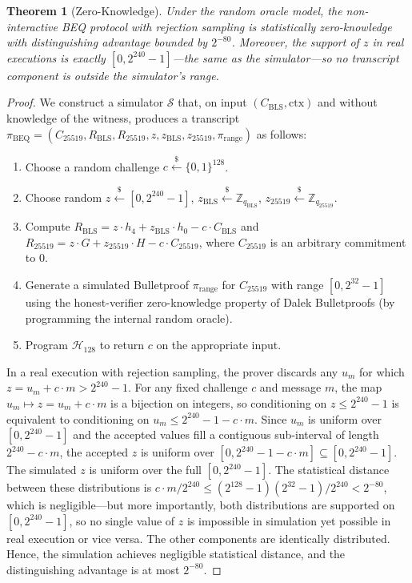 \documentclass[11pt]{article}
\theoremstyle{definitionstyle}
\newtheorem{theorem}{Theorem}[section]
\theoremstyle{plain}
\begin{document}
\begin{theorem}[Zero-Knowledge]
Under the random oracle model, the non-interactive BEQ protocol with rejection sampling is statistically zero-knowledge with distinguishing advantage bounded by $2^{-80}$. Moreover, the support of $z$ in real executions is exactly $[0, 2^{240}-1]$---the same as the simulator---so no transcript component is outside the simulator's range.
\end{theorem}
\begin{proof}
We construct a simulator $\mathcal{S}$ that, on input $(C_{\text{BLS}}, \text{ctx})$ and without knowledge of the witness, produces a transcript $\pi_{\text{BEQ}} = (C_{25519}, R_{\text{BLS}}, R_{25519}, z, z_{\text{BLS}}, z_{25519}, \pi_{\text{range}})$ as follows:
\begin{enumerate}
\item Choose a random challenge $c \xleftarrow{\$} \{0,1\}^{128}$.
\item Choose random $z \xleftarrow{\$} [0, 2^{240}-1]$, $z_{\text{BLS}} \xleftarrow{\$} \mathbb{Z}_{q_{\text{BLS}}}$, $z_{25519} \xleftarrow{\$} \mathbb{Z}_{q_{25519}}$.
\item Compute $R_{\text{BLS}} = z \cdot h_4 + z_{\text{BLS}} \cdot h_0 - c \cdot C_{\text{BLS}}$ and $R_{25519} = z \cdot G + z_{25519} \cdot H - c \cdot C_{25519}$, where $C_{25519}$ is an arbitrary commitment to $0$.
\item Generate a simulated Bulletproof $\pi_{\text{range}}$ for $C_{25519}$ with range $[0,2^{32}-1]$ using the honest-verifier zero-knowledge property of Dalek Bulletproofs (by programming the internal random oracle).
\item Program $\mathcal{H}_{128}$ to return $c$ on the appropriate input.
\end{enumerate}
In a real execution with rejection sampling, the prover discards any $u_m$ for which $z = u_m + c \cdot m > 2^{240}-1$. For any fixed challenge $c$ and message $m$, the map $u_m \mapsto z = u_m + c \cdot m$ is a bijection on integers, so conditioning on $z \le 2^{240}-1$ is equivalent to conditioning on $u_m \le 2^{240}-1 - c \cdot m$. Since $u_m$ is uniform over $[0, 2^{240}-1]$ and the accepted values fill a contiguous sub-interval of length $2^{240} - c \cdot m$, the accepted $z$ is uniform over $[0, 2^{240}-1 - c \cdot m] \subseteq [0, 2^{240}-1]$. The simulated $z$ is uniform over the full $[0, 2^{240}-1]$. The statistical distance between these distributions is $c \cdot m / 2^{240} \le (2^{128}-1)(2^{32}-1)/2^{240} < 2^{-80}$, which is negligible---but more importantly, both distributions are supported on $[0, 2^{240}-1]$, so no single value of $z$ is impossible in simulation yet possible in real execution or vice versa. The other components are identically distributed. Hence, the simulation achieves negligible statistical distance, and the distinguishing advantage is at most $2^{-80}$.
\end{proof}
\end{document}
